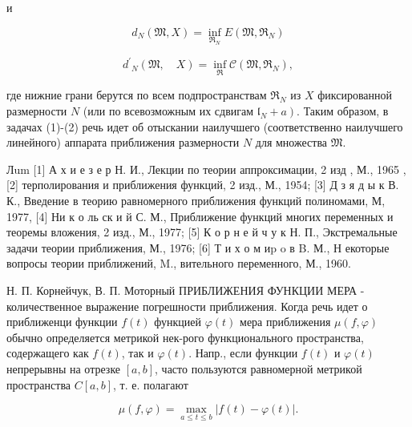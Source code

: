 \documentclass[10pt]{article}
\begin{document}
и



\[

d_{N}(\mathfrak{M}, X)=\inf _{\mathfrak{R}_{N}} E\left(\mathfrak{M}, \mathfrak{\Re}_{N}\right)

\]



\[

d^{\prime}{ }_{N}(\mathfrak{M}, \quad X)=\inf _{\mathfrak{R}} \mathscr{C}\left(\mathfrak{M}, \mathfrak{R}_{N}\right),

\]



где нижние грани берутся по всем подпространствам $\mathfrak{\Re}_{N}$ из $X$ фиксированной размерности $N$ (или по всевозможным их сдвигам $\left.\mathfrak{l}_{N}+a\right)$. Таким образом, в задачах (1)-(2) речь идет об отыскании наилучшего (соответственно наилучшего линейного) аппарата приближения размерности $N$ для множества $\mathfrak{M}$.



Лum [1] А х и е з е р Н. И., Лекции по теории аппроксимации, 2 изд , М., 1965 , [2] терполирования и приближения функций, 2 изд., М., 1954; [3] Д з я д ы к В. К., Введение в теорию равномерного приближения функций полиномами, М, 1977, [4] Ни к о ль ск и й С. М., Приближение функций многих переменных и теоремы вложения, 2 изд., М., 1977; [5] К о р н е й ч у к Н. П., Экстремальные задачи теории приближения, М., 1976; [6] Т и х о м иp o в B. М., Н екоторые вопросы теории приближений, M., вительного переменного, М., 1960.



Н. П. Корнейчук, В. П. Моторный ПРИБЛИЖЕНИЯ ФУНКЦИИ МЕРА - количественное выражение погрешности приближения. Когда речь идет о приближенци функции $f(t)$ функцией $\varphi(t)$ мера приближения $\mu(f, \varphi)$ обычно определяется метрикой нек-рого функционального пространства, содержащего как $f(t)$, так и $\varphi(t)$. Напр., если функции $f(t)$ и $\varphi(t)$ непрерывны на отрезке $[a, b]$, часто пользуются равномерной метрикой пространства $C[a, b]$, т. е. полагают



\[

\mu(f, \varphi)=\max _{a \leqslant t \leqslant b}|f(t)-\varphi(t)| .

\]
\end{document}
